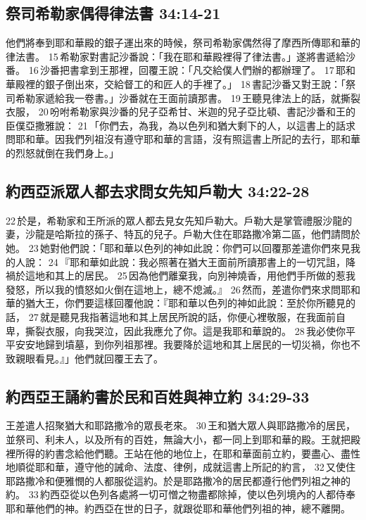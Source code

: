 \subsection{祭司希勒家偶得律法書 34:14-21}
他們將奉到耶和華殿的銀子運出來的時候，祭司希勒家偶然得了摩西所傳耶和華的律法書。 15 希勒家對書記沙番說：「我在耶和華殿裡得了律法書。」遂將書遞給沙番。 16 沙番把書拿到王那裡，回覆王說：「凡交給僕人們辦的都辦理了。 17 耶和華殿裡的銀子倒出來，交給督工的和匠人的手裡了。」 18 書記沙番又對王說：「祭司希勒家遞給我一卷書。」沙番就在王面前讀那書。 19 王聽見律法上的話，就撕裂衣服， 20 吩咐希勒家與沙番的兒子亞希甘、米迦的兒子亞比頓、書記沙番和王的臣僕亞撒雅說： 21 「你們去，為我，為以色列和猶大剩下的人，以這書上的話求問耶和華。因我們列祖沒有遵守耶和華的言語，沒有照這書上所記的去行，耶和華的烈怒就倒在我們身上。」

\subsection{約西亞派眾人都去求問女先知戶勒大 34:22-28}
22 於是，希勒家和王所派的眾人都去見女先知戶勒大。戶勒大是掌管禮服沙龍的妻，沙龍是哈斯拉的孫子、特瓦的兒子。戶勒大住在耶路撒冷第二區，他們請問於她。 23 她對他們說：「耶和華以色列的神如此說：你們可以回覆那差遣你們來見我的人說： 24 『耶和華如此說：我必照著在猶大王面前所讀那書上的一切咒詛，降禍於這地和其上的居民。 25 因為他們離棄我，向別神燒香，用他們手所做的惹我發怒，所以我的憤怒如火倒在這地上，總不熄滅。』 26 然而，差遣你們來求問耶和華的猶大王，你們要這樣回覆他說：『耶和華以色列的神如此說：至於你所聽見的話， 27 就是聽見我指著這地和其上居民所說的話，你便心裡敬服，在我面前自卑，撕裂衣服，向我哭泣，因此我應允了你。這是我耶和華說的。 28 我必使你平平安安地歸到墳墓，到你列祖那裡。我要降於這地和其上居民的一切災禍，你也不致親眼看見。』」他們就回覆王去了。

\subsection{約西亞王誦約書於民和百姓與神立約 34:29-33}
王差遣人招聚猶大和耶路撒冷的眾長老來。 30 王和猶大眾人與耶路撒冷的居民，並祭司、利未人，以及所有的百姓，無論大小，都一同上到耶和華的殿。王就把殿裡所得的約書念給他們聽。王站在他的地位上，在耶和華面前立約，要盡心、盡性地順從耶和華，遵守他的誡命、法度、律例，成就這書上所記的約言， 32 又使住耶路撒冷和便雅憫的人都服從這約。於是耶路撒冷的居民都遵行他們列祖之神的約。 33 約西亞從以色列各處將一切可憎之物盡都除掉，使以色列境內的人都侍奉耶和華他們的神。約西亞在世的日子，就跟從耶和華他們列祖的神，總不離開。

